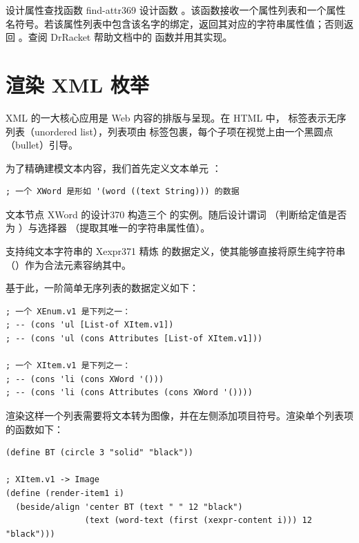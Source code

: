 \begin{exercise}{设计属性查找函数 find-attr}{369}
设计函数 。该函数接收一个属性列表和一个属性名符号。若该属性列表中包含该名字的绑定，返回其对应的字符串属性值；否则返回 。查阅 DrRacket 帮助文档中的  函数并用其实现。
\end{exercise}

\section{渲染 XML 枚举 }
\label{sec:22.2_rendering_xml}

XML 的一大核心应用是 Web 内容的排版与呈现。在 HTML 中， 标签表示无序列表（unordered list），列表项由  标签包裹，每个子项在视觉上由一个黑圆点（bullet）引导。

为了精确建模文本内容，我们首先定义文本单元 ：
\begin{lstlisting}[language=BSL]
; 一个 XWord 是形如 '(word ((text String))) 的数据
\end{lstlisting}

\begin{exercise}{文本节点 XWord 的设计}{370}
构造三个  的实例。随后设计谓词 （判断给定值是否为 ）与选择器 （提取其唯一的字符串属性值）。
\end{exercise}

\begin{exercise}{支持纯文本字符串的 Xexpr}{371}
精炼  的数据定义，使其能够直接将原生纯字符串（）作为合法元素容纳其中。
\end{exercise}

基于此，一阶简单无序列表的数据定义如下：
\begin{lstlisting}[language=BSL]
; 一个 XEnum.v1 是下列之一：
; -- (cons 'ul [List-of XItem.v1])
; -- (cons 'ul (cons Attributes [List-of XItem.v1]))

; 一个 XItem.v1 是下列之一：
; -- (cons 'li (cons XWord '()))
; -- (cons 'li (cons Attributes (cons XWord '())))
\end{lstlisting}

渲染这样一个列表需要将文本转为图像，并在左侧添加项目符号。渲染单个列表项的函数如下：
\begin{lstlisting}[language=BSL]
(define BT (circle 3 "solid" "black"))

; XItem.v1 -> Image
(define (render-item1 i)
  (beside/align 'center BT (text " " 12 "black")
                (text (word-text (first (xexpr-content i))) 12 "black")))
\end{lstlisting}

